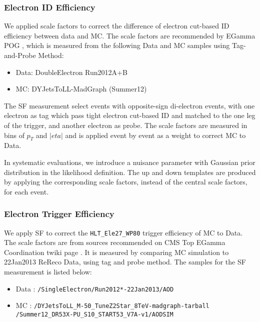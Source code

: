 \documentclass{cmspaperpdf}
\begin{document}
\subsubsection{Electron ID Efficiency}
We applied scale factors to correct the difference of electron cut-based ID efficiency between data and MC. The scale factors are recommended by EGamma POG\cite{Electron-ID-efficiency wiki}\cite{Electron-ID-efficiency AN} , which is measured from the following Data and MC samples using Tag-and-Probe Method:
\begin{itemize}
\item Data: DoubleElectron Run2012A+B
\item MC: DYJetsToLL-MadGraph (Summer12)
\end{itemize}
The SF measurement select events with opposite-sign di-electron events, with one electron as tag which pass tight electron cut-based ID and matched to the one leg of the trigger, and another electron as probe. The scale factors are measured in bins of $p_T$ and $|eta|$ and is applied event by event as a weight to correct MC to Data.

In systematic evaluations, we introduce a nuisance parameter with Gaussian prior distribution in the likelihood definition. The up and down templates are produced by applying the corresponding scale factors, instead of the central scale factors, for each event. 

\subsubsection{Electron Trigger Efficiency}
We apply SF to correct the \texttt{HLT\_Ele27\_WP80} trigger efficiency of MC to Data. The scale factors are from sources recommended on CMS Top EGamma Coordination twiki page \cite{Top-Egamma-wiki}. It is measured by comparing MC simulation to 22Jan2013 ReReco Data, using tag and probe method\cite{Electron-Trigger-Efficiency wiki}\cite{Electron-Trigger-Efficiency AN}. The samples for the SF measurement is listed below:
\begin{itemize}
\item Data : \texttt{/SingleElectron/Run2012*-22Jan2013/AOD}
\item MC : \texttt{/DYJetsToLL\_M-50\_TuneZ2Star\_8TeV-madgraph-tarball \\
           /Summer12\_DR53X-PU\_S10\_START53\_V7A-v1/AODSIM}
\end{itemize}
\end{document}
